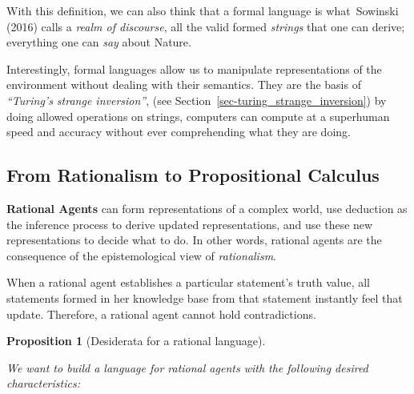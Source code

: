 \documentclass[
  letterpaper,
  12pt,
  british]{tufte-book}
\theoremstyle{plain}
\newtheorem{proposition}{Proposition}[chapter]
\theoremstyle{definition}
\theoremstyle{plain}
\theoremstyle{remark}
\begin{document}
With this definition, we can also think that a formal language is
what~Sowinski
(2016)
calls a \emph{realm of discourse}, all the valid formed
\emph{strings} that
one can derive; everything one can \emph{say} about Nature.

Interestingly, formal languages allow us to manipulate representations
of the environment without dealing with their semantics. They are the
basis of \emph{``Turing's strange inversion''}, (see
Section~\ref{sec-turing_strange_inversion}) by doing allowed operations
on strings, computers can compute at a superhuman speed and accuracy
without ever comprehending what they are doing.

\hypertarget{sec-from_rationalism}{%
\subsection{From Rationalism to Propositional
Calculus}\label{sec-from_rationalism}}

\textbf{Rational Agents} can form representations of a complex world,
use deduction as the inference process to derive updated
representations, and use these new representations to decide what to do.
In other words, rational agents are the consequence of the
epistemological view of \emph{rationalism}.

When a rational agent establishes a particular statement's truth value,
all statements formed in her knowledge base from that statement
instantly feel that update. Therefore, a rational agent cannot hold
contradictions.

\leavevmode{}%
\begin{proposition}[Desiderata for a rational
language]\label{prp-desiderata_language}

We want to build a language for rational agents with the following
desired characteristics:

\end{proposition}
\end{document}
